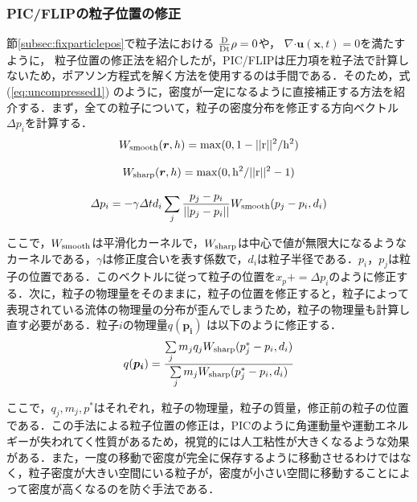\documentclass[a4j,12pt]{jreport}
\begin{document}
\subsubsection{PIC/FLIPの粒子位置の修正}\label{subsubsec:fixparticlepos}
節\ref{subsec:fixparticlepos}で粒子法における
$\frac{\rm{D}}{\rm{Dt}}\rho  = 0$や，
$\nabla\boldsymbol{\cdot}\bm{u} (\bm{x},t)  = 0$を満たすように，
粒子位置の修正法を紹介したが，PIC/FLIPは圧力項を粒子法で計算しないため，ポアソン方程式を解く方法を使用するのは手間である．そのため，式 (\ref{eq:uncompressed1}) のように，密度が一定になるように直接補正する方法を紹介する．まず，全ての粒子について，粒子の密度分布を修正する方向ベクトル$\varDelta p_i$を計算する．
\begin{equation}\label{eq:w_smooth}
W_{\rm{smooth}} (\bm{r},h)  = \rm{max} (0,1-||r||^2/h^2) 
\end{equation} 

\begin{equation}\label{eq:w_sharp}
W_{\rm{sharp}} (\bm{r},h)  = \rm{max} (0,h^2/||r||^2 - 1) 
\end{equation} 

\begin{equation}\label{eq:fixVector}
\varDelta p_i = -\gamma \varDelta td_i\sum\limits_j \frac{p_j - p_i}{||p_j - p_i||}W_{\rm{smooth}} (p_j - p_i,d_i) 
\end{equation} 

ここで，$W_{\rm{smooth}}$は平滑化カーネルで，$W_{\rm{sharp}}$は中心で値が無限大になるようなカーネルである，$\gamma$は修正度合いを表す係数で，$d_i$は粒子半径である．$p_i$，$p_j$は粒子の位置である．このベクトルに従って粒子の位置を$x_p += \varDelta p_i$のように修正する．次に，粒子の物理量をそのままに，粒子の位置を修正すると，粒子によって表現されている流体の物理量の分布が歪んでしまうため，粒子の物理量も計算し直す必要がある．粒子$i$の物理量$q (\bm{p_i}) $ は以下のように修正する．
\begin{equation}\label{eq:fixVelocity}
q (\bm{p_i})  = \frac{\sum\limits_j m_jq_jW_{\rm{sharp}} (p^*_j - p_i,d_i) }{\sum\limits_j m_jW_{\rm{sharp}} (p^*_j - p_i,d_i) }
\end{equation} 

ここで，$q_j,m_j,p^*$はそれぞれ，粒子の物理量，粒子の質量，修正前の粒子の位置である．この手法による粒子位置の修正は，PICのように角運動量や運動エネルギーが失われてく性質があるため，視覚的には人工粘性が大きくなるような効果がある．また，一度の移動で密度が完全に保存するように移動させるわけではなく，粒子密度が大きい空間にいる粒子が，密度が小さい空間に移動することによって密度が高くなるのを防ぐ手法である．
\end{document}
